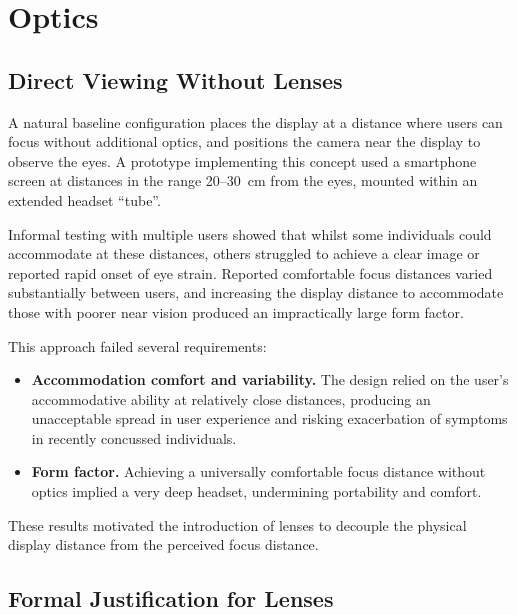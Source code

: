 \section{Optics}

\subsection{Direct Viewing Without Lenses}

A natural baseline configuration places the display at a distance where users can focus without additional optics, and positions the camera near the display to observe the eyes. A prototype implementing this concept used a smartphone screen at distances in the range 20--30~cm from the eyes, mounted within an extended headset ``tube''.

Informal testing with multiple users showed that whilst some individuals could accommodate at these distances, others struggled to achieve a clear image or reported rapid onset of eye strain. Reported comfortable focus distances varied substantially between users, and increasing the display distance to accommodate those with poorer near vision produced an impractically large form factor.

This approach failed several requirements:

\begin{itemize}
    \item \textbf{Accommodation comfort and variability.} The design relied on the user's accommodative ability at relatively close distances, producing an unacceptable spread in user experience and risking exacerbation of symptoms in recently concussed individuals.

    \item \textbf{Form factor.} Achieving a universally comfortable focus distance without optics implied a very deep headset, undermining portability and comfort.
\end{itemize}

These results motivated the introduction of lenses to decouple the physical display distance from the perceived focus distance.


\subsection{Formal Justification for Lenses}


